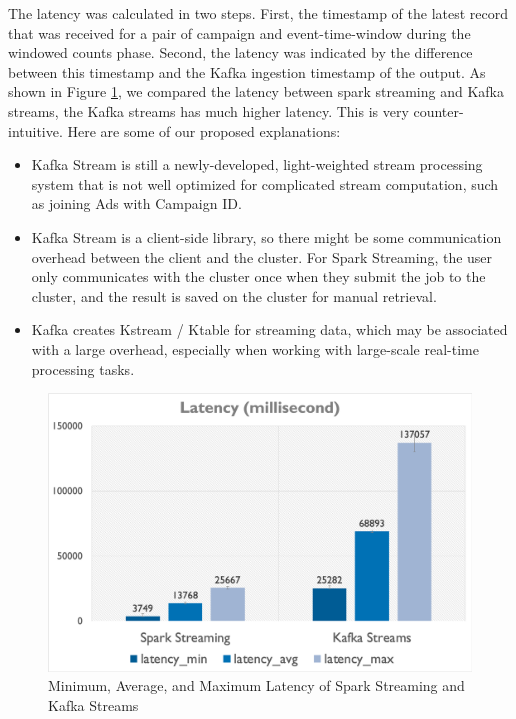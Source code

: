 \documentclass[pdftex,twocolumn,10pt,letterpaper]{article}
\begin{document}
The latency was calculated in two steps. First, the timestamp of the latest record that was received for a pair of campaign and event-time-window during the windowed counts phase. Second, the latency was indicated by the difference between this timestamp and the Kafka ingestion timestamp of the output. As shown in Figure \ref{fig:latency}, we compared the latency between spark streaming and Kafka streams, the Kafka streams has much higher latency. This is very counter-intuitive. Here are some of our proposed explanations: 
\begin{itemize}
    \item Kafka Stream is still a newly-developed, light-weighted stream processing system that is not well optimized for complicated stream computation, such as joining Ads with Campaign ID. 
    \item Kafka Stream is a client-side library, so there might be some communication overhead between the client and the cluster. For Spark Streaming, the user only communicates with the cluster once when they submit the job to the cluster, and the result is saved on the cluster for manual retrieval.  
    \item Kafka creates Kstream / Ktable for streaming data, which may be associated with a large overhead, especially when working with large-scale real-time processing tasks. 
\end{itemize}

\begin{figure}
    \centering
    \includegraphics[width=\linewidth]{latency.png}
    \caption{Minimum, Average, and Maximum Latency of Spark Streaming and Kafka Streams}
    \label{fig:latency}
\end{figure}
\end{document}
